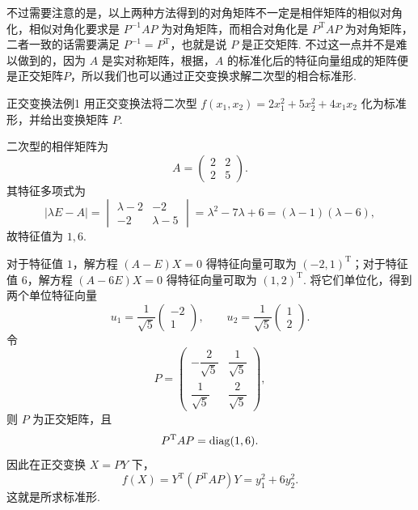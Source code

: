 不过需要注意的是，以上两种方法得到的对角矩阵不一定是相伴矩阵的相似对角化，相似对角化要求是 $P^{-1}AP$ 为对角矩阵，而相合对角化是 $P^\mathrm{T}AP$ 为对角矩阵，二者一致的话需要满足 $P^{-1} = P^\mathrm{T}$，也就是说 $P$ 是正交矩阵. 不过这一点并不是难以做到的，因为 $A$ 是实对称矩阵，根据，$A$ 的标准化后的特征向量组成的矩阵便是正交矩阵$P$，所以我们也可以通过正交变换求解二次型的相合标准形.

\begin{example}{}{正交变换法例1}
    用正交变换法将二次型 $f(x_1,x_2) = 2x_1^2 + 5x_2^2 + 4x_1x_2$ 化为标准形，并给出变换矩阵 $P$.
\end{example}

\begin{solution}
    二次型的相伴矩阵为
    \[
        A=\begin{pmatrix}
            2 & 2 \\
            2 & 5
        \end{pmatrix}.
    \]
    其特征多项式为
    \[
        |\lambda E-A|=\begin{vmatrix}
            \lambda-2 & -2        \\
            -2        & \lambda-5
        \end{vmatrix}
        =\lambda^2-7\lambda+6=(\lambda-1)(\lambda-6),
    \]
    故特征值为 $1,6$.

    对于特征值 $1$，解方程 $(A-E)X=0$ 得特征向量可取为 $(-2,1)^\mathrm{T}$；对于特征值 $6$，解方程 $(A-6E)X=0$ 得特征向量可取为 $(1,2)^\mathrm{T}$. 将它们单位化，得到两个单位特征向量
    \[
        u_1=\frac{1}{\sqrt{5}}\begin{pmatrix}
            -2 \\
            1
        \end{pmatrix},
        \qquad
        u_2=\frac{1}{\sqrt{5}}\begin{pmatrix}
            1 \\
            2
        \end{pmatrix}.
    \]
    令
    \[
        P=\begin{pmatrix}
            -\dfrac{2}{\sqrt{5}} & \dfrac{1}{\sqrt{5}} \\
            \dfrac{1}{\sqrt{5}}  & \dfrac{2}{\sqrt{5}}
        \end{pmatrix},
    \]
    则 $P$ 为正交矩阵，且
    \[
        P^\mathrm{T}AP=\operatorname{diag}(1,6).
    \]
    因此在正交变换 $X=PY$ 下，
    \[
        f(X)=Y^\mathrm{T}(P^\mathrm{T}AP)Y=y_1^2+6y_2^2.
    \]
    这就是所求标准形.
\end{solution}

